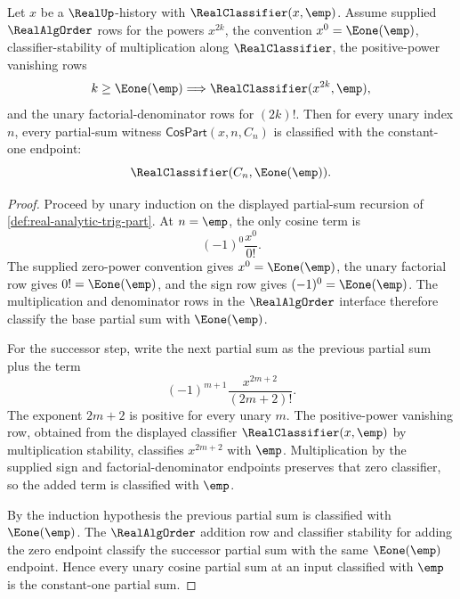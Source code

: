 \begin{lemma}
\label{lem:real-analytic-cospart-empty-constant-one}
Let $x$ be a $\RealUp$-history with $\RealClassifier(x,\emp)$. Assume supplied $\RealAlgOrder$ rows for the powers $x^{2k}$, the convention $x^0=\Eone(\emp)$, classifier-stability of multiplication along $\RealClassifier$, the positive-power vanishing rows
$$
k\geq \Eone(\emp)\Longrightarrow \RealClassifier(x^{2k},\emp),
$$
and the unary factorial-denominator rows for $(2k)!$. Then for every unary index $n$, every partial-sum witness $\mathsf{CosPart}(x,n,C_n)$ is classified with the constant-one endpoint:
$$
\RealClassifier(C_n,\Eone(\emp)).
$$
\end{lemma}
\begin{proof}
Proceed by unary induction on the displayed partial-sum recursion of \autoref{def:real-analytic-trig-part}. At $n=\emp$, the only cosine term is
$$
(-1)^0\frac{x^0}{0!}.
$$
The supplied zero-power convention gives $x^0=\Eone(\emp)$, the unary factorial row gives $0!=\Eone(\emp)$, and the sign row gives $(-1)^0=\Eone(\emp)$. The multiplication and denominator rows in the $\RealAlgOrder$ interface therefore classify the base partial sum with $\Eone(\emp)$.

For the successor step, write the next partial sum as the previous partial sum plus the term
$$
(-1)^{m+1}\frac{x^{2m+2}}{(2m+2)!}.
$$
The exponent $2m+2$ is positive for every unary $m$. The positive-power vanishing row, obtained from the displayed classifier $\RealClassifier(x,\emp)$ by multiplication stability, classifies $x^{2m+2}$ with $\emp$. Multiplication by the supplied sign and factorial-denominator endpoints preserves that zero classifier, so the added term is classified with $\emp$.

By the induction hypothesis the previous partial sum is classified with $\Eone(\emp)$. The $\RealAlgOrder$ addition row and classifier stability for adding the zero endpoint classify the successor partial sum with the same $\Eone(\emp)$ endpoint. Hence every unary cosine partial sum at an input classified with $\emp$ is the constant-one partial sum.
\end{proof}

